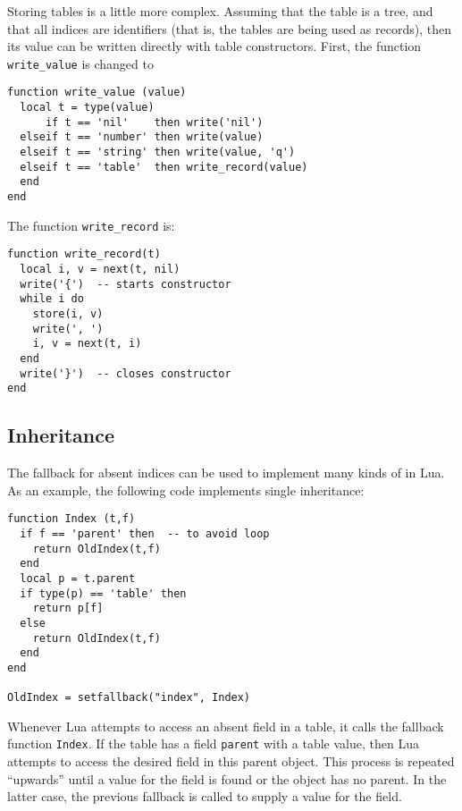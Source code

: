 Storing tables is a little more complex.
Assuming that the table is a tree,
and that all indices are identifiers
(that is, the tables are being used as records),
then its value can be written directly with table constructors.
First, the function \verb'write_value' is changed to
\begin{verbatim}
function write_value (value)
  local t = type(value)
      if t == 'nil'    then write('nil')
  elseif t == 'number' then write(value)
  elseif t == 'string' then write(value, 'q')
  elseif t == 'table'  then write_record(value)
  end
end
\end{verbatim}
The function \verb'write_record' is:
\begin{verbatim}
function write_record(t)
  local i, v = next(t, nil)
  write('{')  -- starts constructor
  while i do
    store(i, v)
    write(', ')
    i, v = next(t, i)
  end
  write('}')  -- closes constructor
end
\end{verbatim}


\subsection{Inheritance} \label{exfallback}
The fallback for absent indices can be used to implement many
kinds of  in Lua.
As an example,
the following code implements single inheritance:
\begin{verbatim}
function Index (t,f)
  if f == 'parent' then  -- to avoid loop
    return OldIndex(t,f)
  end
  local p = t.parent
  if type(p) == 'table' then
    return p[f]
  else
    return OldIndex(t,f)
  end
end

OldIndex = setfallback("index", Index)
\end{verbatim}
Whenever Lua attempts to access an absent field in a table,
it calls the fallback function \verb'Index'.
If the table has a field \verb'parent' with a table value,
then Lua attempts to access the desired field in this parent object.
This process is repeated ``upwards'' until a value
for the field is found or the object has no parent.
In the latter case, the previous fallback is called to supply a value
for the field.

